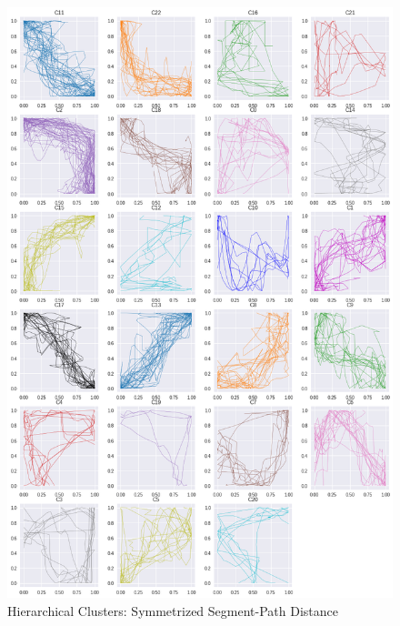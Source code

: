 \begin{figure}[h]
  \centering
  \includegraphics[width=\linewidth,height=\textheight,keepaspectratio]{figs/clusters/CLU_H_ALL[SSPD].png}
  \caption{ Hierarchical Clusters: Symmetrized Segment-Path Distance }
\end{figure}
